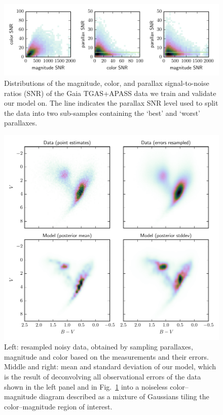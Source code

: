 \documentclass[manuscript, letterpaper]{aastex6}
\makeatletter
\let\origsection\section
\renewcommand\section{\@ifstar{\starsection}{\nostarsection}}
\newcommand\nostarsection[1]{\sectionprelude\origsection{#1}}
\newcommand\starsection[1]{\sectionprelude\origsection*{#1}}
\newcommand\sectionprelude{\vspace{1em}}
\newcommand{\figref}[1]{{\xspace}Fig.~\ref{#1}}
\makeatother
\begin{document}

\section{Application to Gaia}

\begin{figure}
\hspace*{-3mm}\includegraphics[width=15.75cm]{datasummary.pdf}
\caption{Distributions of the magnitude, color, and parallax signal-to-noise ratios (SNR) of the Gaia TGAS+APASS data we train and validate our model on. The line indicates the parallax SNR level used to split the data into two sub-samples containing the `best' and `worst' parallaxes.}
\label{fig:datasummary}
\end{figure}

\begin{figure}
\hspace*{-3mm}\includegraphics[width=15cm]{colmagdiag_mainsample.pdf}
\caption{Left: resampled noisy data, obtained by sampling parallaxes, magnitude and color based on the measurements and their errors. Middle and right: mean and standard deviation of our model, which is the result of deconvolving all observational errors of the data shown in the left panel and in \figref{fig:datasummary} into a noiseless color--magnitude diagram described as a mixture of Gaussians tiling the color--magnitude region of interest. }
\label{fig:colmagdiag_mainsample}
\end{figure}
\end{document}
